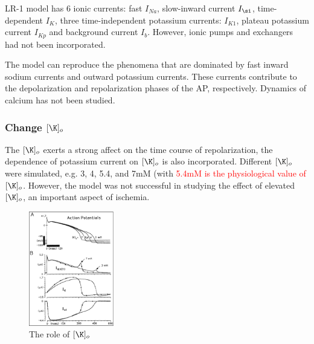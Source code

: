 LR-1 model has 6 ionic currents: fast $I_{Na}$, slow-inward current
$I_\si$, time-dependent $I_K$, three time-independent potassium currents:
$I_{K1}$, plateau potassium current $I_{Kp}$ and background
current $I_b$. However, ionic pumps and exchangers had not been
incorporated. 

The model can reproduce the phenomena that are dominated by fast
inward sodium currents and outward potassium currents. These currents
contribute to the depolarization and repolarization phases of the AP,
respectively. Dynamics of calcium has not been studied. 

\subsubsection{Change $[\K]_o$}
\label{sec:extracellular-K}
\label{sec:Ko-level}

The $[\K]_o$ exerts a strong affect on the time course of repolarization, the
dependence of potassium current  on $[\K]_o$ is also incorporated. Different
$[\K]_o$ were  simulated, e.g. 3, 4, 5.4, and 7mM (with \textcolor{red}{5.4mM is
the  physiological value of} $[\K]_o$. However, the model was not successful
in studying the effect of elevated $[\K]_o$, an important aspect of ischemia.

\begin{figure}[hbt]
  \centerline{\includegraphics[height=5cm,
    angle=0]{./images/LR1_role_Ko.eps}}
\caption{The role of $[\K]_o$}
\label{fig:LR1_role_Ko}
\end{figure}


